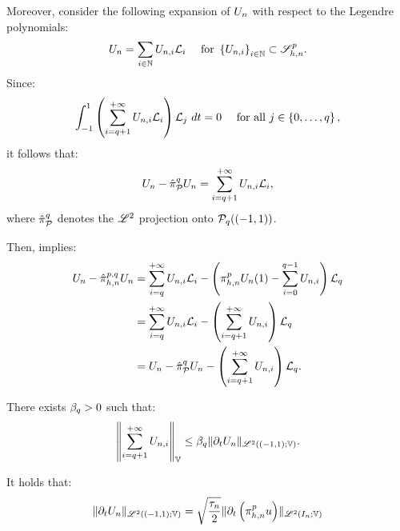 Moreover, consider the following expansion of $U_n$ with respect to the Legendre polynomials:
\begin{align}
    U_n &= \sum_{i \in \mathbb{N}} U_{n, i} \mathcal{L}_i &\text{ for } \left\{ U_{n, i} \right\}_{i \in \mathbb{N}} \subset \mathscr{S}^p_{h, n}.
\end{align}
Since:
\begin{align}
    \int_{-1}^1 \left( \sum_{i = q + 1}^{+\infty} U_{n, i} \mathcal{L}_i \right) \mathcal{L}_j ~ dt &= 0 &\text{ for all } j \in \left\{ 0, \dots, q \right\},
\end{align}
it follows that:
\begin{align}
    U_n - \hat{\pi}_{\mathcal{P}_{}}^q U_n = \sum_{i = q + 1}^{+\infty} U_{n, i} \mathcal{L}_i,
\end{align}
where $\hat{\pi}_{\mathcal{P}_{}}^q$ denotes the $\mathscr{L}^{2}$ projection onto $\mathcal{P}_{q}((-1, 1))$.

Then,  implies:
\begin{align}
    U_n - \hat{\pi}_{h, n}^{p, q} U_n &= \sum_{i = q}^{+\infty} U_{n, i} \mathcal{L}_i - \left( \pi_{h, n}^p U_n(1) - \sum_{i = 0}^{q - 1} U_{n, i} \right) \mathcal{L}_q \notag \\
    &= \sum_{i = q}^{+\infty} U_{n, i} \mathcal{L}_i - \left( \sum_{i = q + 1}^{+\infty} U_{n, i} \right) \mathcal{L}_q \notag \\
    &= U_n - \hat{\pi}_{\mathcal{P}_{}}^q U_n - \left( \sum_{i = q + 1}^{+\infty} U_{n, i} \right) \mathcal{L}_q.
\end{align}

\begin{lemma}
    There exists $\beta_{q} > 0$ such that:
    \begin{align}
        \left\lVert \sum_{i = q + 1}^{+\infty} U_{n, i} \right\rVert_{\mathbb{V}} \leq \beta_{q} \lVert \partial_t U_n \rVert_{\mathscr{L}^{2}((-1, 1); \mathbb{V})}.
    \end{align}
\end{lemma}

\begin{lemma}
    It holds that:
    \begin{align}
        \lVert \partial_t U_n \rVert_{\mathscr{L}^{2}((-1, 1); \mathbb{V})} = \sqrt{\frac{\tau_n}{2}} \lVert \partial_t \left( \pi_{h, n}^p u \right) \rVert_{\mathscr{L}^{2}(I_n; \mathbb{V})}
    \end{align}
\end{lemma}

